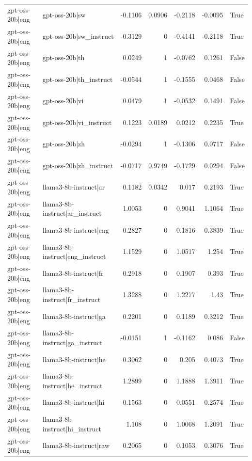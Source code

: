 \begin{table}
\begin{tabular}{l l r r r r l}
gpt-oss-20b|eng & gpt-oss-20b|sw & -0.1106 & 0.0906 & -0.2118 & -0.0095 & True \\
gpt-oss-20b|eng & gpt-oss-20b|sw_instruct & -0.3129 & 0 & -0.4141 & -0.2118 & True \\
gpt-oss-20b|eng & gpt-oss-20b|th & 0.0249 & 1 & -0.0762 & 0.1261 & False \\
gpt-oss-20b|eng & gpt-oss-20b|th_instruct & -0.0544 & 1 & -0.1555 & 0.0468 & False \\
gpt-oss-20b|eng & gpt-oss-20b|vi & 0.0479 & 1 & -0.0532 & 0.1491 & False \\
gpt-oss-20b|eng & gpt-oss-20b|vi_instruct & 0.1223 & 0.0189 & 0.0212 & 0.2235 & True \\
gpt-oss-20b|eng & gpt-oss-20b|zh & -0.0294 & 1 & -0.1306 & 0.0717 & False \\
gpt-oss-20b|eng & gpt-oss-20b|zh_instruct & -0.0717 & 0.9749 & -0.1729 & 0.0294 & False \\
gpt-oss-20b|eng & llama3-8b-instruct|ar & 0.1182 & 0.0342 & 0.017 & 0.2193 & True \\
gpt-oss-20b|eng & llama3-8b-instruct|ar_instruct & 1.0053 & 0 & 0.9041 & 1.1064 & True \\
gpt-oss-20b|eng & llama3-8b-instruct|eng & 0.2827 & 0 & 0.1816 & 0.3839 & True \\
gpt-oss-20b|eng & llama3-8b-instruct|eng_instruct & 1.1529 & 0 & 1.0517 & 1.254 & True \\
gpt-oss-20b|eng & llama3-8b-instruct|fr & 0.2918 & 0 & 0.1907 & 0.393 & True \\
gpt-oss-20b|eng & llama3-8b-instruct|fr_instruct & 1.3288 & 0 & 1.2277 & 1.43 & True \\
gpt-oss-20b|eng & llama3-8b-instruct|ga & 0.2201 & 0 & 0.1189 & 0.3212 & True \\
gpt-oss-20b|eng & llama3-8b-instruct|ga_instruct & -0.0151 & 1 & -0.1162 & 0.086 & False \\
gpt-oss-20b|eng & llama3-8b-instruct|he & 0.3062 & 0 & 0.205 & 0.4073 & True \\
gpt-oss-20b|eng & llama3-8b-instruct|he_instruct & 1.2899 & 0 & 1.1888 & 1.3911 & True \\
gpt-oss-20b|eng & llama3-8b-instruct|hi & 0.1563 & 0 & 0.0551 & 0.2574 & True \\
gpt-oss-20b|eng & llama3-8b-instruct|hi_instruct & 1.108 & 0 & 1.0068 & 1.2091 & True \\
gpt-oss-20b|eng & llama3-8b-instruct|raw & 0.2065 & 0 & 0.1053 & 0.3076 & True \\

\end{tabular}
\end{table}
